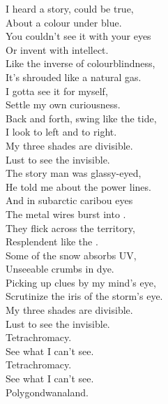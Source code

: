 


I heard a story, could be true, \\
About a colour under blue. \\
You couldn't see it with your eyes \\
Or invent with intellect. \\

Like the inverse of colourblindness, \\
It's shrouded like a natural gas. \\
I gotta see it for myself, \\
Settle my own curiousness. \\

Back and forth, swing like the tide, \\
I look to left and to right. \\
My three shades are divisible. \\
Lust to see the invisible. \\

The story man was glassy-eyed, \\
He told me about the power lines. \\
And in subarctic caribou eyes \\
The metal wires burst into . \\

They flick across the territory, \\
Resplendent like the . \\
Some of the snow absorbs UV, \\
Unseeable crumbs in dye. \\

Picking up clues by my mind's eye, \\
Scrutinize the iris of the storm's eye. \\
My three shades are divisible. \\
Lust to see the invisible. \\

Tetrachromacy. \\
See what I can't see. \\
Tetrachromacy. \\
See what I can't see. \\

Polygondwanaland. \\

